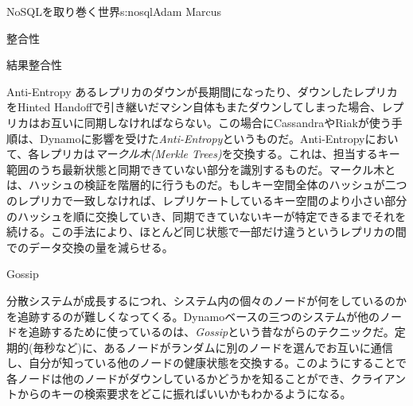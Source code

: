 \begin{aosachapter}{NoSQLを取り巻く世界}{s:nosql}{Adam Marcus}
\begin{aosasect1}{整合性}
\begin{aosasect2}{結果整合性}
\begin{aosasect3}{Anti-Entropy}
あるレプリカのダウンが長期間になったり、ダウンしたレプリカをHinted Handoffで引き継いだマシン自体もまたダウンしてしまった場合、レプリカはお互いに同期しなければならない。この場合にCassandraやRiakが使う手順は、Dynamoに影響を受けた\emph{Anti-Entropy}というものだ。Anti-Entropyにおいて、各レプリカは\emph{マークル木(Merkle Trees)}を交換する。これは、担当するキー範囲のうち最新状態と同期できていない部分を識別するものだ。マークル木とは、ハッシュの検証を階層的に行うものだ。もしキー空間全体のハッシュが二つのレプリカで一致しなければ、レプリケートしているキー空間のより小さい部分のハッシュを順に交換していき、同期できていないキーが特定できるまでそれを続ける。この手法により、ほとんど同じ状態で一部だけ違うというレプリカの間でのデータ交換の量を減らせる。

\end{aosasect3}

\begin{aosasect3}{Gossip}

分散システムが成長するにつれ、システム内の個々のノードが何をしているのかを追跡するのが難しくなってくる。Dynamoベースの三つのシステムが他のノードを追跡するために使っているのは、\emph{Gossip}という昔ながらのテクニックだ。定期的(毎秒など)に、あるノードがランダムに別のノードを選んでお互いに通信し、自分が知っている他のノードの健康状態を交換する。このようにすることで各ノードは他のノードがダウンしているかどうかを知ることができ、クライアントからのキーの検索要求をどこに振ればいいかもわかるようになる。


\end{aosasect3}
\end{aosasect2}
\end{aosasect1}
\end{aosachapter}
